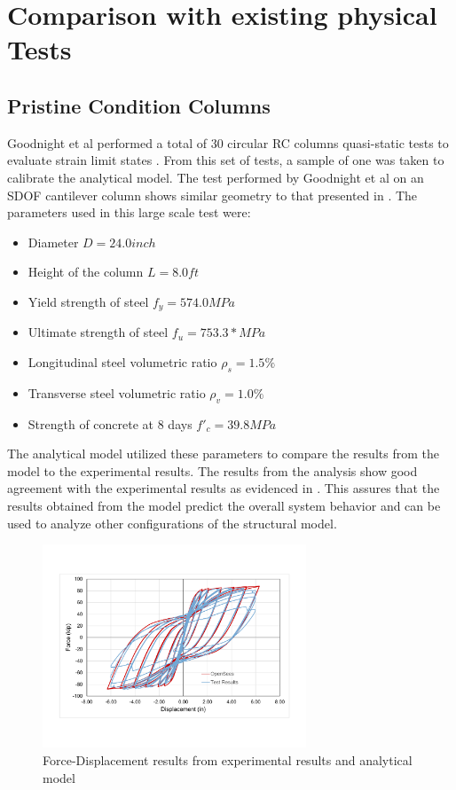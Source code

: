 \section{Comparison with existing physical Tests}
\subsection{Pristine Condition Columns}

Goodnight et al performed a total of 30 circular RC columns quasi-static tests to evaluate strain limit states \cite{Goodnight2016}. From this set of tests, a sample of one was taken to calibrate the analytical model. The test performed by Goodnight et al on an SDOF cantilever column shows similar geometry to that presented in . The parameters used in this large scale test were:

\begin{itemize}
	\item Diameter $D = 24.0 inch$
	\item Height of the column $L = 8.0 ft$
	\item Yield strength of steel $f_{y} = 574.0 MPa$
	\item Ultimate strength of steel $f_{u} = 753.3 * MPa$
	\item Longitudinal steel volumetric ratio $\rho_{s} = 1.5\% $
	\item Transverse steel volumetric ratio $\rho_{v} = 1.0\% $
	\item Strength of concrete at 8 days $f'_{c} = 39.8 MPa$
\end{itemize}

The analytical model utilized these parameters to compare the results from the model to the experimental results. The results from the analysis show good agreement with the experimental results as evidenced in . This assures that the results obtained from the model predict the overall system behavior and can be used to analyze other configurations of the structural model.

\begin{figure}[htbp]
	\centering
	\includegraphics[width=0.7\textwidth]{Chapter-4/figs/Model_Calibration_Goodnight2016}
	\caption{Force-Displacement results from experimental results \cite{Goodnight2013} and analytical model}
	\label{fig:ModelCalibration}
\end{figure}

